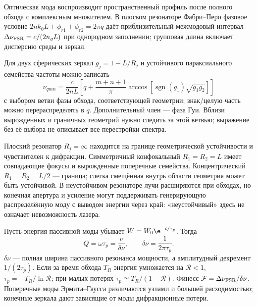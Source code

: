 
Оптическая мода воспроизводит пространственный профиль после полного обхода с комплексным множителем. В плоском резонаторе Фабри–Перо фазовое условие $2nk_0L+\phi_{r1}+\phi_{r2}=2\pi q$ даёт приблизительный межмодовый интервал $\Delta\nu_{\rm FSR}=c/(2n_gL)$ при однородном заполнении; групповая длина включает дисперсию среды и зеркал.

Для двух сферических зеркал $g_j=1-L/R_j$ и устойчивого параксиального семейства частоты можно записать
\begin{equation}
 \nu_{qmn}=\frac{c}{2nL}\left[q+\frac{m+n+1}{\pi}\arccos[\operatorname{sgn}(g_1)\sqrt{g_1g_2}]\right]
\end{equation}
с выбором ветви фазы обхода, соответствующей геометрии; знак/целую часть можно перераспределять в $q$. Дополнительный член — фаза Гуи. Вблизи вырожденных и граничных геометрий нужно следить за этой ветвью; выражение без её выбора не описывает все перестройки спектра.

Плоский резонатор $R_j=\infty$ находится на границе геометрической устойчивости и чувствителен к дифракции. Симметричный конфокальный $R_1=R_2=L$ имеет совпадающие фокусы и вырожденные поперечные семейства. Концентрический $R_1=R_2=L/2$ — граница; слегка смещённая внутрь области геометрия может быть устойчивой. В неустойчивом резонаторе лучи расширяются при обходах, но конечная апертура и усиление могут поддерживать генерирующую распределённую моду с выводом энергии через край: «неустойчивый» здесь не означает невозможность лазера.

Пусть энергия пассивной моды убывает $W=W_0\e^{-t/\tau_p}$. Тогда
\begin{equation}
 Q=\omega\tau_p=\frac{\nu}{\delta\nu},\qquad
 \delta\nu=\frac1{2\pi\tau_p}.
\end{equation}
$\delta\nu$ — полная ширина пассивного резонанса мощности, а амплитудный декремент $1/(2\tau_p)$. Если за время обхода $T_R$ энергия умножается на $\mathcal R<1$, $\tau_p=-T_R/\ln\mathcal R$; при малых потерях $\tau_p\simeq T_R/(1-\mathcal R)$. Финесс $\mathcal F=\Delta\nu_{\rm FSR}/\delta\nu$. Поперечные моды Эрмита–Гаусса различаются узлами и большей расходимостью; конечные зеркала дают зависящие от моды дифракционные потери.
